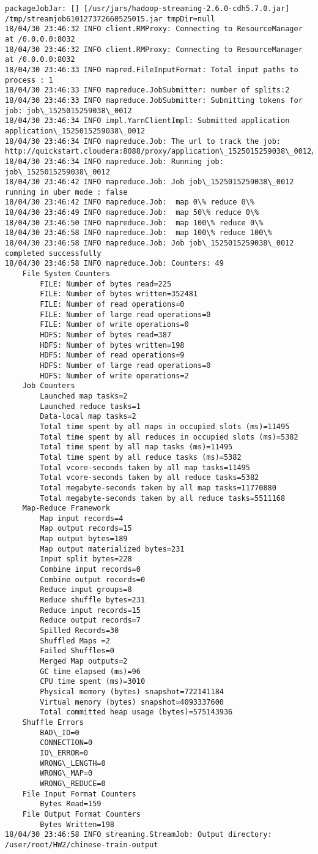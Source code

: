 \documentclass[11pt]{article}
\begin{document}
    \begin{Verbatim}[commandchars=\\\{\}]
packageJobJar: [] [/usr/jars/hadoop-streaming-2.6.0-cdh5.7.0.jar] /tmp/streamjob610127372660525015.jar tmpDir=null
18/04/30 23:46:32 INFO client.RMProxy: Connecting to ResourceManager at /0.0.0.0:8032
18/04/30 23:46:32 INFO client.RMProxy: Connecting to ResourceManager at /0.0.0.0:8032
18/04/30 23:46:33 INFO mapred.FileInputFormat: Total input paths to process : 1
18/04/30 23:46:33 INFO mapreduce.JobSubmitter: number of splits:2
18/04/30 23:46:33 INFO mapreduce.JobSubmitter: Submitting tokens for job: job\_1525015259038\_0012
18/04/30 23:46:34 INFO impl.YarnClientImpl: Submitted application application\_1525015259038\_0012
18/04/30 23:46:34 INFO mapreduce.Job: The url to track the job: http://quickstart.cloudera:8088/proxy/application\_1525015259038\_0012/
18/04/30 23:46:34 INFO mapreduce.Job: Running job: job\_1525015259038\_0012
18/04/30 23:46:42 INFO mapreduce.Job: Job job\_1525015259038\_0012 running in uber mode : false
18/04/30 23:46:42 INFO mapreduce.Job:  map 0\% reduce 0\%
18/04/30 23:46:49 INFO mapreduce.Job:  map 50\% reduce 0\%
18/04/30 23:46:50 INFO mapreduce.Job:  map 100\% reduce 0\%
18/04/30 23:46:58 INFO mapreduce.Job:  map 100\% reduce 100\%
18/04/30 23:46:58 INFO mapreduce.Job: Job job\_1525015259038\_0012 completed successfully
18/04/30 23:46:58 INFO mapreduce.Job: Counters: 49
	File System Counters
		FILE: Number of bytes read=225
		FILE: Number of bytes written=352481
		FILE: Number of read operations=0
		FILE: Number of large read operations=0
		FILE: Number of write operations=0
		HDFS: Number of bytes read=387
		HDFS: Number of bytes written=198
		HDFS: Number of read operations=9
		HDFS: Number of large read operations=0
		HDFS: Number of write operations=2
	Job Counters 
		Launched map tasks=2
		Launched reduce tasks=1
		Data-local map tasks=2
		Total time spent by all maps in occupied slots (ms)=11495
		Total time spent by all reduces in occupied slots (ms)=5382
		Total time spent by all map tasks (ms)=11495
		Total time spent by all reduce tasks (ms)=5382
		Total vcore-seconds taken by all map tasks=11495
		Total vcore-seconds taken by all reduce tasks=5382
		Total megabyte-seconds taken by all map tasks=11770880
		Total megabyte-seconds taken by all reduce tasks=5511168
	Map-Reduce Framework
		Map input records=4
		Map output records=15
		Map output bytes=189
		Map output materialized bytes=231
		Input split bytes=228
		Combine input records=0
		Combine output records=0
		Reduce input groups=8
		Reduce shuffle bytes=231
		Reduce input records=15
		Reduce output records=7
		Spilled Records=30
		Shuffled Maps =2
		Failed Shuffles=0
		Merged Map outputs=2
		GC time elapsed (ms)=96
		CPU time spent (ms)=3010
		Physical memory (bytes) snapshot=722141184
		Virtual memory (bytes) snapshot=4093337600
		Total committed heap usage (bytes)=575143936
	Shuffle Errors
		BAD\_ID=0
		CONNECTION=0
		IO\_ERROR=0
		WRONG\_LENGTH=0
		WRONG\_MAP=0
		WRONG\_REDUCE=0
	File Input Format Counters 
		Bytes Read=159
	File Output Format Counters 
		Bytes Written=198
18/04/30 23:46:58 INFO streaming.StreamJob: Output directory: /user/root/HW2/chinese-train-output

    \end{Verbatim}
\end{document}
